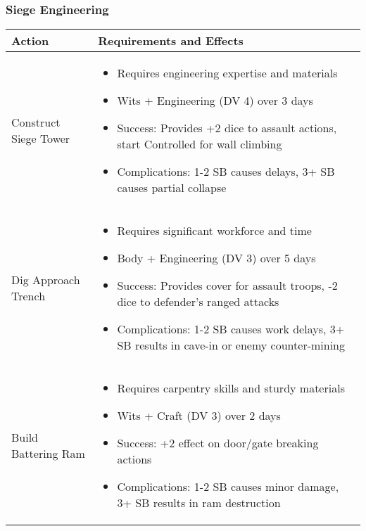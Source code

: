 \subsubsection{Siege Engineering}
\begin{longtable}{|>{\raggedright\arraybackslash}p{4cm}|>{\raggedright\arraybackslash}p{8cm}|}
\hline
\textbf{Action} & \textbf{Requirements and Effects} \\
\hline
Construct Siege Tower & 
\begin{itemize}
    \item Requires engineering expertise and materials
    \item Wits + Engineering (DV 4) over 3 days
    \item Success: Provides +2 dice to assault actions, start Controlled for wall climbing
    \item Complications: 1-2 SB causes delays, 3+ SB causes partial collapse
\end{itemize} \\
\hline
Dig Approach Trench & 
\begin{itemize}
    \item Requires significant workforce and time
    \item Body + Engineering (DV 3) over 5 days
    \item Success: Provides cover for assault troops, -2 dice to defender's ranged attacks
    \item Complications: 1-2 SB causes work delays, 3+ SB results in cave-in or enemy counter-mining
\end{itemize} \\
\hline
Build Battering Ram & 
\begin{itemize}
    \item Requires carpentry skills and sturdy materials
    \item Wits + Craft (DV 3) over 2 days
    \item Success: +2 effect on door/gate breaking actions
    \item Complications: 1-2 SB causes minor damage, 3+ SB results in ram destruction
\end{itemize} \\
\hline
\end{longtable}

